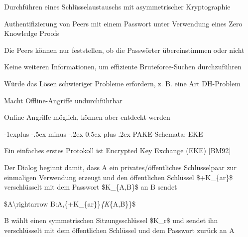 \documentclass[a4paper]{article}
\makeatletter
\renewcommand{\subsection}{\@startsection{subsection}{2}{0mm}%
 {-1explus -.5ex minus -.2ex}%
 {0.5ex plus .2ex}%
 {\normalfont\normalsize\bfseries}}
\makeatother
\begin{document}
\begin{multicols}{3}
\begin{itemize*}
            \begin{itemize*}
                  \item Durchführen eines Schlüsselaustauschs mit asymmetrischer Kryptographie
                  \item Authentifizierung von Peers mit einem Passwort unter Verwendung eines Zero Knowledge Proofs
                  \item Die Peers können nur feststellen, ob die Passwörter übereinstimmen oder nicht
                  \item Keine weiteren Informationen, um effiziente Bruteforce-Suchen durchzuführen
                  \begin{itemize*} \item Würde das Lösen schwieriger Probleme erfordern, z. B. eine Art DH-Problem \item Macht Offline-Angriffe undurchführbar \end{itemize*}
                  \item Online-Angriffe möglich, können aber entdeckt werden
            \end{itemize*}
      \end{itemize*}


      \subsection{PAKE-Schemata: EKE}

      \begin{itemize*}
            \item
            Ein einfaches erstes Protokoll ist Encrypted Key Exchange (EKE)
            {[}BM92{]}
            \item
            Der Dialog beginnt damit, dass A ein privates/öffentliches
            Schlüsselpaar zur einmaligen Verwendung erzeugt und den öffentlichen
            Schlüssel \$+K\_\{ar\}\$ verschlüsselt mit dem Passwort \$K\_\{A,B\}\$
            an B sendet

            \begin{enumerate*}
                  \def\labelenumi{\arabic{enumi}.}
                  \item \$A\textbackslash rightarrow B:A,\{+K\_\{ar\}\}\emph{\{K}\{A,B\}\}\$
            \end{enumerate*}
            \item
            B wählt einen symmetrischen Sitzungsschlüssel \$K\_r\$ und sendet ihn
            verschlüsselt mit dem öffentlichen Schlüssel und dem Passwort zurück
            an A


\end{itemize*}
\end{multicols}
\end{document}
